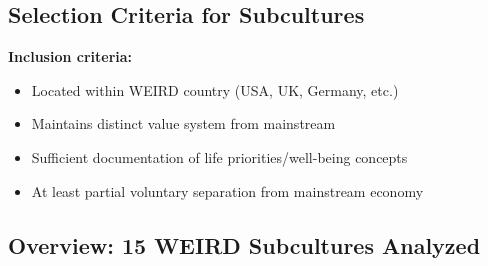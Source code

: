 \subsection{Selection Criteria for Subcultures}

\textbf{Inclusion criteria:}
\begin{itemize}[nosep]
\item Located within WEIRD country (USA, UK, Germany, etc.)
\item Maintains distinct value system from mainstream
\item Sufficient documentation of life priorities/well-being concepts
\item At least partial voluntary separation from mainstream economy
\end{itemize}

\subsection{Overview: 15 WEIRD Subcultures Analyzed}

